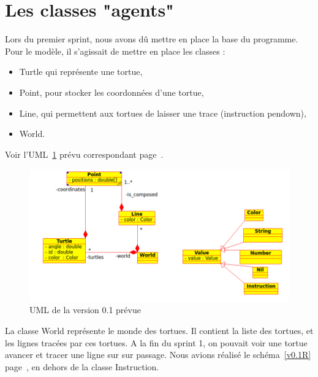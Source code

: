 \section{Les classes "agents"}
Lors du premier sprint, nous avons dû mettre en place la base du programme.\\ Pour le modèle, il s'agissait de mettre en place les classes :
\begin{itemize}
\item Turtle qui représente une tortue, 
\item Point, pour stocker les coordonnées d'une tortue,
\item Line, qui permettent aux tortues de laisser une trace (instruction pendown),
\item World.\\
\end{itemize}
Voir l'UML~\ref{v0.1} prévu correspondant page~\pageref{v0.1}.\\
\begin{figure}[h]
\caption{\label{v0.1} UML de la version 0.1 prévue}
\includegraphics[scale=0.5]{doc/report/uml/v01.png}
\end{figure}
\newpage

La classe World représente le monde des tortues. Il contient la liste des tortues, et les lignes tracées par ces tortues.
A la fin du sprint 1, on pouvait voir une tortue avancer et tracer une ligne sur sur passage.
Nous avions réalisé le schéma~\ref{v0.1R} page~\pageref{v0.1R}, en dehors de la classe Instruction.\\

